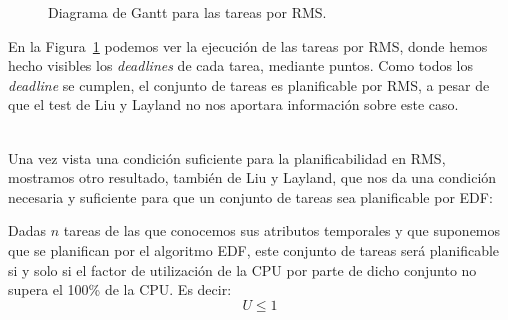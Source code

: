 \begin{ejemplo}
\begin{figure}[H]
        \caption{Diagrama de Gantt para las tareas por RMS\@.}
        \label{fig:gantt_ejm}
    \end{figure}
    En la Figura~\ref{fig:gantt_ejm} podemos ver la ejecución de las tareas por RMS, donde hemos hecho visibles los \textit{deadlines} de cada tarea, mediante puntos. Como todos los \textit{deadline} se cumplen, el conjunto de tareas es planificable por RMS, a pesar de que el test de Liu y Layland no nos aportara información sobre este caso.
\end{ejemplo}~\\

Una vez vista una condición suficiente para la planificabilidad en RMS, mostramos otro resultado, también de Liu y Layland, que nos da una condición necesaria y suficiente para que un conjunto de tareas sea planificable por EDF:

\begin{teo}
    Dadas $n$ tareas de las que conocemos sus atributos temporales y que suponemos que se planifican por el algoritmo EDF, este conjunto de tareas será planificable si y solo si el factor de utilización de la CPU por parte de dicho conjunto no supera el 100\% de la CPU\@. Es decir:
    \begin{equation*}
        U \leq 1
    \end{equation*}
\end{teo}

